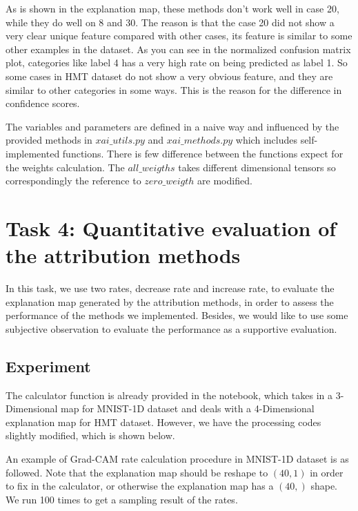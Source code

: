 \documentclass[conference]{IEEEtran}
\begin{document}
As is shown in the explanation map, these methods don't work well in case 20, while they do well on 8 and 30. The reason is that the case 20 did not show a very clear unique feature compared with other cases, its feature is similar to some other examples in the dataset. 
As you can see in the normalized confusion matrix plot, categories like label 4 has a very high rate on being predicted as label 1. So some cases in HMT dataset do not show a very obvious feature, and they are similar to other categories in some ways. This is the reason for the difference in confidence scores.\par
The variables and parameters are defined in a naive way and influenced by the provided methods in $xai\_utils.py$ and $xai\_methods.py$ which includes self-implemented functions. There is few difference between the functions expect for the weights calculation. The $all\_weigths$ takes different dimensional tensors so correspondingly the reference to $zero\_weigth$ are modified.
\section{Task 4: Quantitative evaluation of the attribution methods}

In this task, we use two rates, decrease rate and increase rate, to evaluate the explanation map generated by the attribution methods, in order to assess the performance of the methods we implemented. Besides, we would like to use some subjective observation to evaluate the performance as a supportive evaluation.

\subsection {Experiment}

The calculator function is already provided in the notebook, which takes in a 3-Dimensional map for MNIST-1D dataset and deals with a 4-Dimensional explanation map for HMT dataset. However, we have the processing codes slightly modified, which is shown below.

An example of Grad-CAM rate calculation procedure in MNIST-1D dataset is as followed. Note that the explanation map should be reshape to $(40,1)$ in order to fix in the calculator, or otherwise the explanation map has a $(40,)$ shape. We run 100 times to get a sampling result of the rates.
\end{document}
